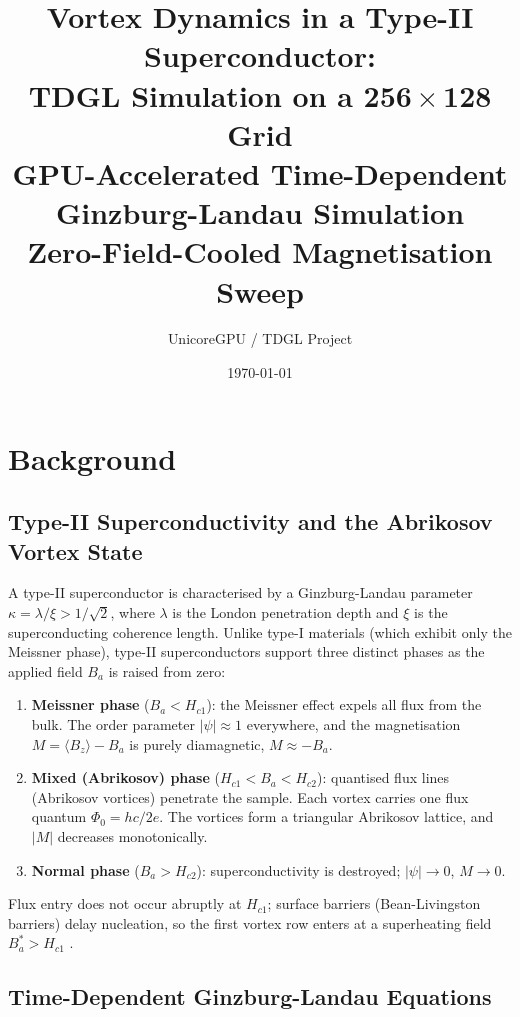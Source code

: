 \documentclass[11pt,a4paper]{article}
\title{%
  \textbf{Vortex Dynamics in a Type-II Superconductor:\\
  TDGL Simulation on a 256\,$\times$\,128 Grid}\\[0.5em]
  \large GPU-Accelerated Time-Dependent Ginzburg-Landau Simulation\\
  Zero-Field-Cooled Magnetisation Sweep
}
\author{UnicoreGPU / TDGL Project}
\date{\today}
\newcommand{\Hcone}{H_{c1}}
\newcommand{\Hctwo}{H_{c2}}
\newcommand{\kGL}{\kappa}
\newcommand{\Ba}{B_a}
\begin{document}
\maketitle
\tableofcontents
\newpage

\section{Background}

\subsection{Type-II Superconductivity and the Abrikosov Vortex State}

A type-II superconductor is characterised by a Ginzburg-Landau parameter
$\kGL = \lambda/\xi > 1/\sqrt{2}$, where $\lambda$ is the London penetration
depth and $\xi$ is the superconducting coherence length.
Unlike type-I materials (which exhibit only the Meissner phase), type-II
superconductors support three distinct phases as the applied field $\Ba$ is
raised from zero:

\begin{enumerate}
  \item \textbf{Meissner phase} ($\Ba < \Hcone$): the Meissner effect expels
        all flux from the bulk.  The order parameter $|\psi| \approx 1$
        everywhere, and the magnetisation $M = \langle B_z \rangle - \Ba$
        is purely diamagnetic, $M \approx -\Ba$.

  \item \textbf{Mixed (Abrikosov) phase} ($\Hcone < \Ba < \Hctwo$): quantised
        flux lines (Abrikosov vortices) penetrate the sample.  Each vortex
        carries one flux quantum $\Phi_0 = hc/2e$.  The vortices form a
        triangular Abrikosov lattice, and $|M|$ decreases monotonically.

  \item \textbf{Normal phase} ($\Ba > \Hctwo$): superconductivity is
        destroyed; $|\psi| \to 0$, $M \to 0$.
\end{enumerate}

Flux entry does not occur abruptly at $\Hcone$; surface barriers
(Bean-Livingston barriers) delay nucleation, so the first vortex row enters at
a superheating field $\Ba^* > \Hcone$ \cite{bean1964}.

\subsection{Time-Dependent Ginzburg-Landau Equations}
\end{document}
